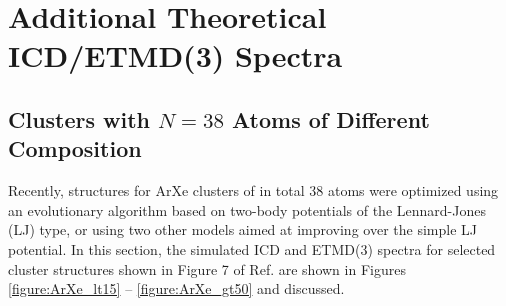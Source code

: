\section{Additional Theoretical ICD/ETMD(3) Spectra}

\subsection{Clusters with $N=38$ Atoms of Different Composition}
Recently, structures for ArXe clusters of in total 38 atoms were optimized
using an evolutionary algorithm based on two-body potentials of the Lennard-Jones (LJ) type, or using two other models aimed at improving over the simple LJ potential.\cite{marques}
In this section, the simulated ICD and ETMD(3) spectra for selected cluster
structures shown in Figure 7 of Ref.  are shown in Figures
\ref{figure:ArXe_lt15} -- \ref{figure:ArXe_gt50} and discussed.


